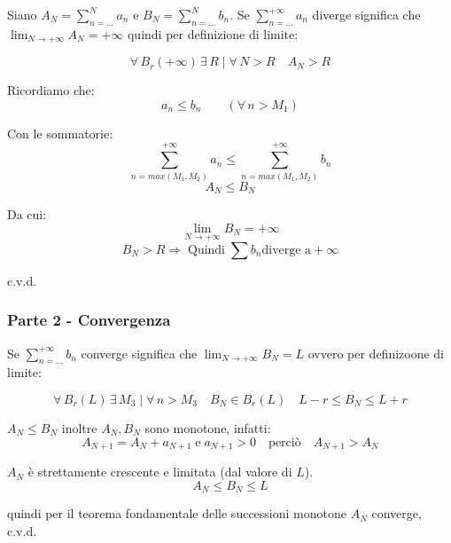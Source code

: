 \documentclass[../dimostrazioni]{subfiles}
\begin{document}
                Siano \(A_N = \sum_{n=\dots}^{N} a_n\) e \(B_N = \sum_{n=\dots}^{N} b_n\). 
                Se \(\sum_{n=\dots}^{+\infty} a_n\) diverge significa che \(\lim_{N \to +\infty} A_N = +\infty\) 
                quindi per definizione di limite:

                \[\forall \, B_r(+\infty) \, \exists \, R \mid \forall \, N > R  \quad A_N > R\]

                Ricordiamo che:
                \[ a_n \leqslant b_n \qquad (\forall \, n > M_1) \]

                Con le sommatorie:
                \[ \sum_{n = max(M_1,M_2)}^{+\infty} a_n \leqslant \sum_{n = max(M_1,M_2)}^{+\infty} b_n\]
                \[  A_N \leqslant B_N   \]

                Da cui:
                \[  \lim_{N \to +\infty} B_N = +\infty  \]
                \[  B_N > R \Rightarrow \; \text{Quindi} \; \sum b_n \text{diverge a} +\infty \]

                c.v.d.

            \subsubsection*{Parte 2 - Convergenza}

                Se \(\sum_{n=\dots}^{+\infty} b_n\) converge significa che \(   \lim_{N \to +\infty} B_N = L  \) ovvero per definizoone di limite:

                \[  \forall \, B_r(L)\, \exists \, M_3 \mid \forall \, n>M_3 \quad B_N \in B_r(L) \quad  L-r \leqslant B_N \leqslant L + r   \]
                
                \(A_N \leqslant B_N\) inoltre \(A_N, B_N\) sono monotone, infatti:
                \[  A_{N+1} = A_N + a_{N+1}\; \text{e} \; a_{N+1} > 0 \quad \text{perciò} \quad A_{N+1} > A_N\]

                \(A_N\) è strettamente crescente e limitata (dal valore di \(L\)).
                \[  A_N \leqslant B_N \leqslant L \]

                quindi per il teorema fondamentale delle successioni monotone \(A_N\) converge, c.v.d.
\end{document}
